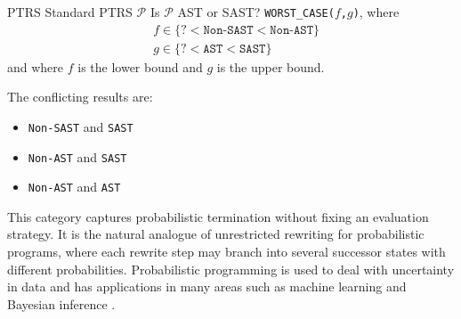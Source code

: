 \begin{formalproblem}
  {PTRS Standard}
  {PTRS $\mathcal{P}$}
  {Is $\mathcal{P}$ AST or SAST?}
  {\texttt{WORST\_CASE(}$f$\texttt{,}$g$\texttt{)}, where}
  \begin{align*}
    &f \in \{\texttt{?} < \texttt{Non-SAST} < \texttt{Non-AST}\}\\
    &g \in \{\texttt{?} < \texttt{AST} < \texttt{SAST}\}
  \end{align*}
  and where $f$ is the lower bound and $g$ is the upper bound.

  The conflicting results are:
  \begin{itemize}
  \item \texttt{Non-SAST} and \texttt{SAST}
  \item \texttt{Non-AST} and \texttt{SAST}
  \item \texttt{Non-AST} and \texttt{AST}
  \end{itemize}
\end{formalproblem}

\begin{motivation}
This category captures probabilistic termination without fixing an evaluation strategy.
It is the natural analogue of unrestricted rewriting for probabilistic programs,
where each rewrite step may branch into several successor states with different probabilities.
Probabilistic programming is used to deal with uncertainty in data and
has applications in many areas such as machine learning and Bayesian inference \cite{Gordon14}.
\end{motivation}

